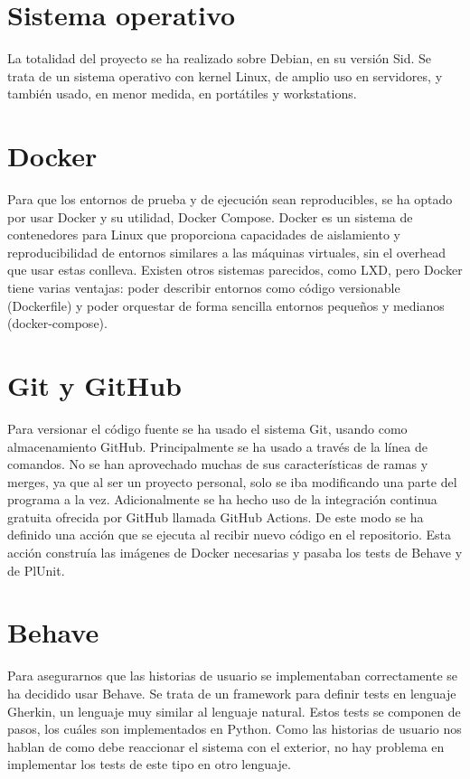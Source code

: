 \documentclass[12pt]{report} %
\begin{document}
\section{Sistema operativo}
La totalidad del proyecto se ha realizado sobre Debian, en su versión Sid. Se trata de un sistema operativo con kernel Linux, 
de amplio uso en servidores, y también usado, en menor medida, en portátiles y workstations.

\section{Docker}
Para que los entornos de prueba y de ejecución sean reproducibles, se ha optado por usar Docker y su utilidad, Docker Compose.
Docker es un sistema de contenedores para Linux que proporciona capacidades de aislamiento y reproducibilidad de entornos similares a las máquinas virtuales, sin el overhead que usar estas conlleva.
Existen otros sistemas parecidos, como LXD, pero Docker tiene varias ventajas: poder describir entornos como código versionable (Dockerfile) y poder orquestar de forma sencilla entornos pequeños y medianos (docker-compose).

\section{Git y GitHub}
Para versionar el código fuente se ha usado el sistema Git, usando como almacenamiento GitHub. Principalmente se ha usado a través de la línea de comandos.
No se han aprovechado muchas de sus características de ramas y merges, ya que al ser un proyecto personal, solo se iba modificando una parte del programa a la vez.
Adicionalmente se ha hecho uso de la integración continua gratuita ofrecida por GitHub llamada GitHub Actions. De este modo se ha definido una acción que se ejecuta al recibir nuevo código en el repositorio.
Esta acción construía las imágenes de Docker necesarias y pasaba los tests de Behave y de PlUnit.

\section{Behave}
Para asegurarnos que las historias de usuario se implementaban correctamente se ha decidido usar Behave.
Se trata de un framework para definir tests en lenguaje Gherkin, un lenguaje muy similar al lenguaje natural. Estos tests se componen de pasos,
los cuáles son implementados en Python. Como las historias de usuario nos hablan de como debe reaccionar el sistema con el exterior, no hay problema en implementar los tests de este tipo en otro lenguaje.
\end{document}
